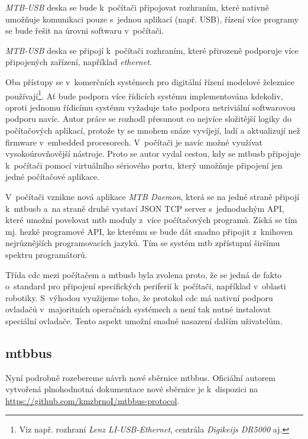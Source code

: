 \begin{compactenum}
\item \textit{MTB-USB} deska se bude k~počítači připojovat rozhraním, které
	nativně umožňuje komunikaci pouze s~jednou aplikací (např. USB), řízení více
	programy se bude řešit na úrovni softwaru v~počítači.
\item \textit{MTB-USB} deska se připojí k~počítači rozhraním, které přirozeně
	podporuje více připojených zařízení, například \textit{ethernet}.
\end{compactenum}

Oba přístupy se v~komerčních systémech pro digitální řízení modelové železnice
používají\footnote{Viz např. rozhraní \textit{Lenz LI-USB-Ethernet}, centrála
\textit{Digikeijs DR5000} aj.}.
Ať bude podpora více řídicích systému implementována kdekoliv, oproti jednomu
řídicímu systému vyžaduje tato podpora netriviální softwarovou podporu navíc.
Autor práce se rozhodl přesunout co nejvíce složitější logiky do počítačových
aplikací, protože ty se mnohem snáze vyvíjejí, ladí a aktualizují než
firmware v~embedded procesorech. V~počítači je navíc možné využívat
vysokoúrovňovější nástroje. Proto se autor vydal cestou, kdy se
\gls{mtbusb} připojuje k~počítači pomocí virtuálního sériového portu, který
umožňuje připojení jen jedné počítačové aplikace.

V~počítači vznikne nová aplikace \textit{MTB Daemon}, která se na jedné
straně připojí k~\gls{mtbusb} a~na straně druhé vystaví JSON TCP
server s~jednoduchým API, které umožní povelovat \gls{mtb} moduly z~více
počítačových programů. Získá se tím mj. hezké programové API, ke kterému
se bude dát snadno připojit z~knihoven nejrůznějších programovacích jazyků.
Tím se systém \gls{mtb} zpřístupní širšímu spektru programátorů.

Třída \gls{cdc} mezi počítačem a \gls{mtbusb} byla zvolena proto, že se jedná
de fakto o~standard pro připojení specifických periferií k~počítači, například
v~oblasti robotiky. S~výhodou využijeme toho, že protokol \gls{cdc} má nativní
podporu ovladačů v~majoritních operačních systémech a není tak nutné instalovat
speciální ovladače. Tento aspekt umožní snadné nasazení dalším uživatelům.

\subsection{\gls{mtbbus}}

Nyní podrobně rozebereme návrh nové sběrnice \gls{mtbbus}. Oficiální autorem
vytvořená plnohodnotná dokumentace nové sběrnice je k~dispozici na
\url{https://github.com/kmzbrnoI/mtbbus-protocol}.

